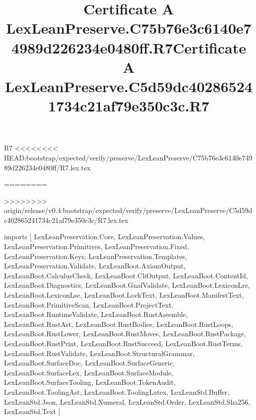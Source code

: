\begin{lexlean}{R7}
<<<<<<<< HEAD:bootstrap/expected/verify/preserve/LexLeanPreserve/C75b76e3c6140e74989d226234e0480ff/R7.lex.tex
\title{Certificate A LexLeanPreserve.C75b76e3c6140e74989d226234e0480ff.R7}
========
\title{Certificate A LexLeanPreserve.C5d59dc402865241734c21af79e350c3c.R7}
>>>>>>>> origin/release/v0.4:bootstrap/expected/verify/preserve/LexLeanPreserve/C5d59dc402865241734c21af79e350c3c/R7.lex.tex
\begin{coremodule}
imports [
  LexLeanPreservation.Core,
  LexLeanPreservation.Values,
  LexLeanPreservation.Primitives,
  LexLeanPreservation.Fixed,
  LexLeanPreservation.Keys,
  LexLeanPreservation.Templates,
  LexLeanPreservation.Validate,
  LexLeanBoot.AxiomOutput,
  LexLeanBoot.CalculusCheck,
  LexLeanBoot.CliOutput,
  LexLeanBoot.ContentId,
  LexLeanBoot.Diagnostics,
  LexLeanBoot.GnafValidate,
  LexLeanBoot.LexiconLre,
  LexLeanBoot.LexiconLse,
  LexLeanBoot.LockText,
  LexLeanBoot.ManifestText,
  LexLeanBoot.PrimitiveScan,
  LexLeanBoot.ProjectText,
  LexLeanBoot.RuntimeValidate,
  LexLeanBoot.RustAssemble,
  LexLeanBoot.RustAst,
  LexLeanBoot.RustBodies,
  LexLeanBoot.RustLoops,
  LexLeanBoot.RustLower,
  LexLeanBoot.RustMoves,
  LexLeanBoot.RustPackage,
  LexLeanBoot.RustPrint,
  LexLeanBoot.RustSucceed,
  LexLeanBoot.RustTerms,
  LexLeanBoot.RustValidate,
  LexLeanBoot.StructuralGrammar,
  LexLeanBoot.SurfaceDoc,
  LexLeanBoot.SurfaceGeneric,
  LexLeanBoot.SurfaceLex,
  LexLeanBoot.SurfaceModule,
  LexLeanBoot.SurfaceTooling,
  LexLeanBoot.TokenAudit,
  LexLeanBoot.ToolingAst,
  LexLeanBoot.ToolingLatex,
  LexLeanStd.Buffer,
  LexLeanStd.Json,
  LexLeanStd.Numeral,
  LexLeanStd.Order,
  LexLeanStd.Sha256,
  LexLeanStd.Text
]


\end{coremodule}
\end{lexlean}
